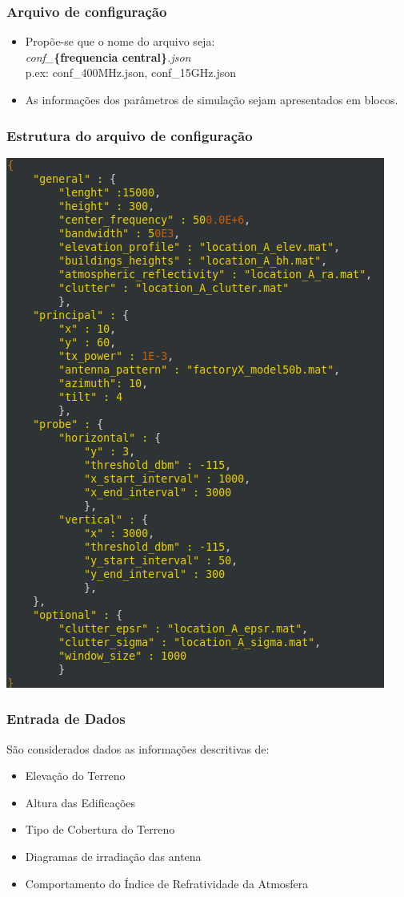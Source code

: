 \documentclass[11pt]{beamer}
\begin{document}
\begin{frame}
	\frametitle{Arquivo de configuração}
	\begin{itemize}
		\item Propõe-se que o nome do arquivo seja:\\
		\textit{conf\_}\textbf{\{frequencia central\}}\textit{.json}\\
		p.ex: conf\_400MHz.json, conf\_15GHz.json
		\item As informações dos parâmetros de simulação sejam apresentados em blocos.
	\end{itemize}
\end{frame}

\begin{frame}
	\frametitle{Estrutura do arquivo de configuração}
	\centering
	\includegraphics[scale=0.3]{json}
\end{frame}

\begin{frame}
	\frametitle{Entrada de Dados}
	São considerados dados as informações descritivas de:
	\begin{itemize}
		\item Elevação do Terreno
		\item Altura das Edificações
		\item Tipo de Cobertura do Terreno
		\item Diagramas de irradiação das antena
		\item Comportamento do Índice de Refratividade da Atmosfera
	\end{itemize}
\end{frame}
\end{document}
